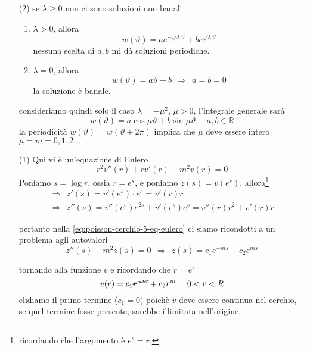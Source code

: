 \documentclass[10pt,a4paper,twoside,openright]{book}
\begin{document}
\begin{dimostrazione}
\begin{enumerate}
\item [(2)] se $\lambda \geqslant 0$ non ci sono soluzioni non banali
\begin{enumerate}
\item $\lambda  >0$, allora
\begin{equation*}
w(\vartheta) =ae^{-\sqrt{\lambda } \vartheta } +be^{\sqrt{\lambda } \vartheta }
\end{equation*}nessuna scelta di $a,b$ mi dà soluzioni periodiche.
\item $\lambda =0$, allora
\begin{equation*}
w(\vartheta) =a\vartheta +b\ \ \Rightarrow \ \ a=b=0
\end{equation*}la soluzione è banale.
\end{enumerate}

consideriamo quindi solo il caso $\lambda =-\mu ^{2}$, $\mu  >0$, l'integrale generale sarà
\begin{equation*}
w(\vartheta) =a\cos \mu \vartheta +b\sin \mu \vartheta,\ \ \ \ a,b\in \mathbb{R}
\end{equation*}la periodicità $w(\vartheta)=w(\vartheta +2\pi)$ implica che $\mu $ deve essere intero $\mu =m=0,1,2\dotsc $
\item [(1)] Qui vi è un'equazione di Eulero
\begin{equation}
r^{2} v''(r) +rv'(r) -m^{2} v(r) =0
\label{eq:poisson-cerchio-5-eq-eulero}
\end{equation}
Poniamo $s=\log r$, ossia $r=e^{s}$, e poniamo $z(s) =v\left(e^{s}\right)$, allora\footnote{ricordando che l'argomento è $e^{s} =r$.}
\begin{equation*}
\begin{array}{ l }
\Rightarrow \ \ z'(s) =v'\left(e^{s}\right) \cdotp e^{s} =v'(r) r\\
\Rightarrow \ \ z''(s) =v''\left(e^{s}\right) e^{2s} +v'\left(e^{s}\right) e^{s} =v''(r) r^{2} +v'(r) r
\end{array}
\end{equation*}

pertanto nella \eqref{eq:poisson-cerchio-5-eq-eulero} ci siamo ricondotti a un problema agli autovalori
\begin{equation*}
z''(s) -m^{2} z(s) =0\ \ \Rightarrow \ \ z(s) =c_{1} e^{-ms} +c_{2} e^{ms}
\end{equation*}

tornando alla funzione $v$ e ricordando che $r=e^{s}$
\begin{equation*}
v(r) =\cancel{c_{1} r^{-m}} +c_{2} r^{m} \ \ \ \ 0< r< R
\end{equation*}elidiamo il primo termine ($c_{1}=0$) poichè $v$ deve essere continua nel cerchio, se quel termine fosse presente, sarebbe illimitata nell'origine.
\end{enumerate}


\end{dimostrazione}
\end{document}
